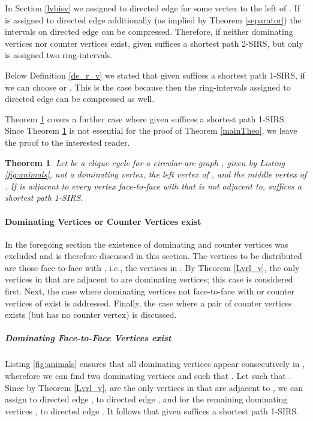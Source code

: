 \documentclass[10pt]{article}
\newtheorem{theorem}{Theorem}[section]
\begin{document}
In Section \ref{lvbisv} we assigned  to directed edge 
for some vertex  to the left of .
If  is assigned to directed edge  
additionally (as implied by Theorem \ref{separator}) 
the intervals on directed edge  can be compressed.
Therefore, if neither dominating vertices nor counter vertices exist, 
 given  suffices a shortest path 2-SIRS, 
but only  is assigned two ring-intervals.

Below Definition \ref{de_r_v} we stated that  given  suffices 
a shortest path 1-SIRS, if we can choose  or .
This is the case because then the ring-intervals assigned to directed edge  
can be compressed as well.

Theorem \ref{theo:1sirs} covers a further case where  given  suffices a shortest path 
1-SIRS.
Since Theorem \ref{theo:1sirs} is not essential for the proof of Theorem \ref{mainTheo}, 
we leave the proof to the interested reader.


\begin{theorem}\label{theo:1sirs}
Let  be a clique-cycle for a circular-arc graph ,  
given by Listing \ref{fig:animals},  not a dominating vertex,  the 
left vertex of , and  the middle vertex of .
If  is adjacent to every vertex face-to-face with  that  is not adjacent 
to,  suffices a shortest path 1-SIRS.
\end{theorem}




\paragraph{Dominating Vertices or Counter Vertices exist}\label{gyros}





In the foregoing section the existence of dominating and counter vertices was excluded and is therefore discussed in this section.
The vertices to be distributed are those face-to-face with , i.e., the vertices in .
By Theorem \ref{Lvrl_v}, the only vertices in  that are adjacent to  are dominating vertices;
this case is considered first.
Next, the case where dominating vertices not face-to-face with  or counter vertices of  exist is addressed. Finally, the case where a pair of counter vertices exists (but  has no counter vertex) is discussed. 



\subparagraph{Dominating Face-to-Face Vertices exist}


Listing \ref{fig:animals} ensures that all dominating vertices appear consecutively in , 
wherefore we can find two dominating vertices  and  such that . 
Let  such that .
Since by Theorem \ref{Lvrl_v},  are the only vertices in  that are adjacent to , we can assign  to directed edge ,  to directed edge , and for the remaining dominating vertices ,  to directed edge .
It follows that  given  suffices a shortest path 1-SIRS.
\end{document}
